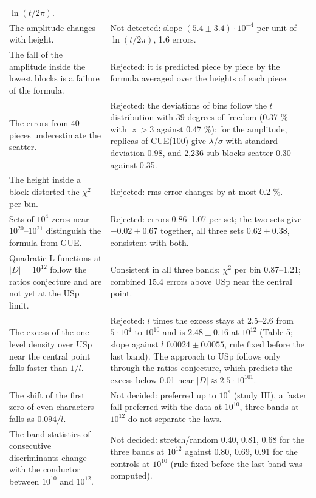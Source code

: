 \documentclass[
  10pt,
]{article}
\begin{document}
{\begin{longtable}[]{@{}
  >{\raggedright\arraybackslash}p{}
  >{\raggedright\arraybackslash}p{}@{}}
\(\ln(t/2\pi)\). \\ \addlinespace[2pt]
The amplitude changes with height. & Not detected: slope
\((5.4 \pm 3.4)\cdot10^{-4}\) per unit of \(\ln(t/2\pi)\), 1.6
errors. \\ \addlinespace[2pt]
The fall of the amplitude inside the lowest blocks is a failure of the
formula. & Rejected: it is predicted piece by piece by the formula
averaged over the heights of each piece. \\ \addlinespace[2pt]
The errors from 40 pieces underestimate the scatter. & Rejected: the
deviations of bins follow the \(t\) distribution with 39 degrees of
freedom (0.37 \% with \(|z| > 3\) against 0.47 \%); for the amplitude,
replicas of CUE(100) give \(\lambda/\sigma\) with standard deviation
0.98, and 2,236 sub-blocks scatter 0.30 against 0.35. \\ \addlinespace[2pt]
The height inside a block distorted the \(\chi^2\) per bin. & Rejected:
rms error changes by at most 0.2 \%. \\ \addlinespace[2pt]
Sets of \(10^4\) zeros near \(10^{20}\)--\(10^{21}\) distinguish the
formula from GUE. & Rejected: errors 0.86--1.07 per set; the two sets
give \(-0.02 \pm 0.67\) together, all three sets \(0.62 \pm 0.38\),
consistent with both. \\ \addlinespace[2pt]
Quadratic L-functions at \(|D| = 10^{12}\) follow the ratios conjecture
and are not yet at the USp limit. & Consistent in all three bands:
\(\chi^2\) per bin 0.87--1.21; combined 15.4 errors above USp near the
central point. \\ \addlinespace[2pt]
The excess of the one-level density over USp near the central point
falls faster than \(1/l\). & Rejected: \(l\) times the excess stays at
2.5--2.6 from \(5\cdot10^4\) to \(10^{10}\) and is \(2.48 \pm 0.16\) at
\(10^{12}\) (Table 5; slope against \(l\) \(0.0024 \pm 0.0055\), rule
fixed before the last band). The approach to USp follows only through
the ratios conjecture, which predicts the excess below 0.01 near
\(|D| \approx 2.5\cdot10^{101}\). \\ \addlinespace[2pt]
The shift of the first zero of even characters falls as \(0.094/l\). &
Not decided: preferred up to \(10^8\) (study III), a faster fall
preferred with the data at \(10^{10}\), three bands at \(10^{12}\) do
not separate the laws. \\ \addlinespace[2pt]
The band statistics of consecutive discriminants change with the
conductor between \(10^{10}\) and \(10^{12}\). & Not decided:
stretch/random 0.40, 0.81, 0.68 for the three bands at \(10^{12}\)
against 0.80, 0.69, 0.91 for the controls at \(10^{10}\) (rule fixed
before the last band was computed). \\ \addlinespace[2pt]
\end{longtable}}
\end{document}
